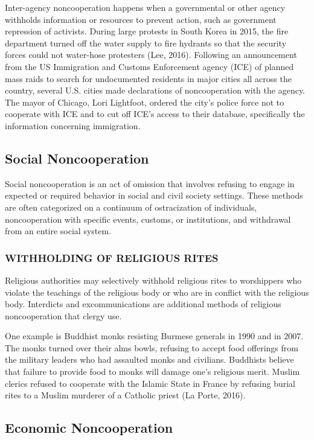 \documentclass[twoside,a4paper,12pt,fleqn,openany]{extbook}
\begin{document}
Inter-agency noncooperation happens when a governmental or other agency withholds information or resources to prevent action, such as government repression of activists. During large protests in South Korea in 2015, the fire department turned off the water supply to fire hydrants so that the security forces could not water-hose protesters (Lee, 2016). Following an announcement from the US Immigration and Customs Enforcement agency (ICE) of planned mass raids to search for undocumented residents in major cities all across the country, several U.S. cities made declarations of noncooperation with the agency. The mayor of Chicago, Lori Lightfoot, ordered the city’s police force not to cooperate with ICE and to cut off ICE’s access to their database, specifically the information concerning immigration.

\subsection*{Social Noncooperation}

Social noncooperation is an act of omission that involves refusing to engage in expected or required behavior in social and civil society settings. These methods are often categorized on a continuum of ostracization of individuals, noncooperation with specific events, customs, or institutions, and withdrawal from an entire social system.

\subsubsection*{WITHHOLDING OF RELIGIOUS RITES}

Religious authorities may selectively withhold religious rites to worshippers who violate the teachings of the religious body or who are in conflict with the religious body. Interdicts and excommunications are additional methods of religious noncooperation that clergy use.

One example is Buddhist monks resisting Burmese generals in 1990 and in 2007. The monks turned over their alms bowls, refusing to accept food offerings from the military leaders who had assaulted monks and civilians. Buddhists believe that failure to provide food to monks will damage one’s religious merit. Muslim clerics refused to cooperate with the Islamic State in France by refusing burial rites to a Muslim murderer of a Catholic priest (La Porte, 2016).

\subsection*{Economic Noncooperation}
\end{document}
